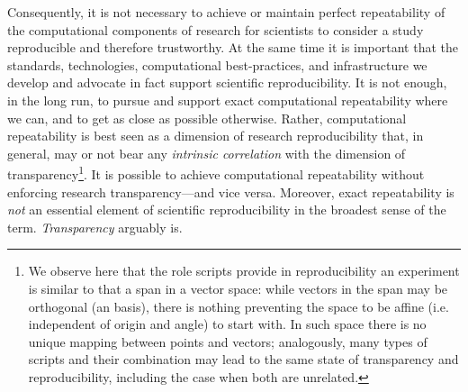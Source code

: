 Consequently, it is not necessary to achieve or
	maintain perfect repeatability of the computational components of research for scientists to
	consider a study reproducible and therefore trustworthy.
At the same time it is important that the standards, technologies,
	computational best-practices, and infrastructure we develop and advocate in fact support scientific reproducibility.
It is not enough, in the long run, to pursue and support exact computational repeatability where we can,
	and to get as close as possible otherwise.
Rather, computational repeatability is best seen as a dimension of research reproducibility that,
in general, may or not bear any \emph{intrinsic correlation} with
	the dimension of transparency\footnote{We observe here that the role scripts provide in
    reproducibility an experiment is similar to that a span in a vector space: while vectors
    in the span may be orthogonal (an basis), there is nothing preventing the space to be affine
    (i.e. independent of origin and angle) to start with. In such space there is no unique mapping
    between points and vectors; analogously, many types of scripts and their combination may lead
    to the same state of transparency and reproducibility, including the case when both are
    unrelated.}.
It is possible to achieve computational repeatability without enforcing research transparency---and vice versa.
Moreover, exact repeatability is \emph{not} an essential element of
scientific reproducibility in the broadest sense of the term. \emph{Transparency} arguably is.


